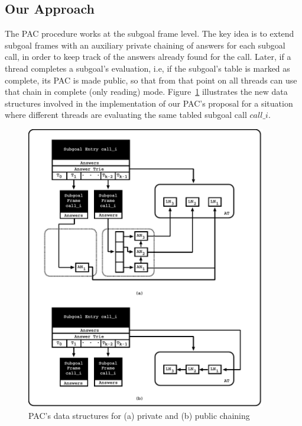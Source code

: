 \documentclass{llncs}
\begin{document}

\subsection{Our Approach}

The PAC procedure works at the subgoal frame level. The key idea is to
extend subgoal frames with an auxiliary private chaining of answers
for each subgoal call, in order to keep track of the answers already
found for the call. Later, if a thread completes a subgoal's
evaluation, i.e, if the subgoal's table is marked as complete, its PAC
is made public, so that from that point on all threads can use that
chain in complete (only reading) mode. Figure~\ref{fig_pac_details}
illustrates the new data structures involved in the implementation of
our PAC's proposal for a situation where different threads are
evaluating the same tabled subgoal call $call\_i$.

\begin{figure}[!ht]
\centering
\includegraphics[width=10.5cm]{figures/pac.pdf}
\caption{PAC's data structures for (a) private and (b) public
  chaining}
\label{fig_pac_details}
\vspace{-\bigskipamount}
\end{figure}
\end{document}
